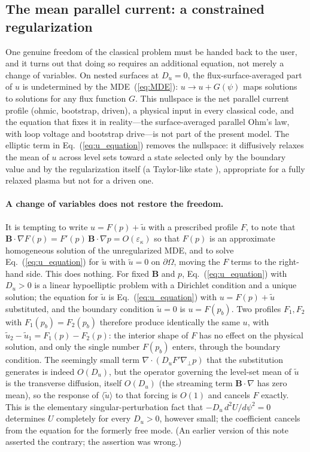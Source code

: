 \documentclass[english]{article}
\newcommand{\bB}{\mathbf{B}}
\newcommand{\gradperp}{\nabla_{\!\perp}}
\begin{document}
\subsection{The mean parallel current: a constrained regularization}
\label{sec:net_current}

One genuine freedom of the classical problem must be handed back to the user, and it turns out
that doing so requires an additional equation, not merely a change of variables. On nested
surfaces at $D_u=0$, the flux-surface-averaged part of $u$ is undetermined by the
MDE~(\ref{eq:MDE}): $u\rightarrow u+G(\psi)$ maps solutions to solutions for any flux function
$G$. This nullspace is the net parallel current profile (ohmic, bootstrap, driven), a physical
input in every classical code, and the equation that fixes it in reality---the surface-averaged
parallel Ohm's law, with loop voltage and bootstrap drive---is not part of the present model.
The elliptic term in Eq.~(\ref{eq:u_equation}) removes the nullspace: it diffusively relaxes the
mean of $u$ across level sets toward a state selected only by the boundary value and by the
regularization itself (a Taylor-like state \cite{boozer1986}), appropriate for a fully relaxed
plasma but not for a driven one.

\paragraph{A change of variables does not restore the freedom.}
It is tempting to write $u=F(p)+\tilde u$ with a prescribed profile $F$, to note that
$\bB\cdot\nabla F(p)=F'(p)\,\bB\cdot\nabla p=O(\varepsilon_\kappa)$ so that $F(p)$ is an
approximate homogeneous solution of the unregularized MDE, and to solve
Eq.~(\ref{eq:u_equation}) for $\tilde u$ with $\tilde u=0$ on $\partial\Omega$, moving the $F$
terms to the right-hand side. This does nothing. For fixed $\bB$ and $p$,
Eq.~(\ref{eq:u_equation}) with $D_u>0$ is a linear hypoelliptic problem with a Dirichlet
condition and a unique solution; the equation for $\tilde u$ is Eq.~(\ref{eq:u_equation}) with
$u=F(p)+\tilde u$ substituted, and the boundary condition $\tilde u=0$ is $u=F(p_b)$. Two
profiles $F_1,F_2$ with $F_1(p_b)=F_2(p_b)$ therefore produce identically the same $u$, with
$\tilde u_2-\tilde u_1=F_1(p)-F_2(p)$: the interior shape of $F$ has no effect on the physical
solution, and only the single number $F(p_b)$ enters, through the boundary condition. The
seemingly small term $\nabla\cdot(D_uF'\gradperp p)$ that the substitution generates is indeed
$O(D_u)$, but the operator governing the level-set mean of $\tilde u$ is the transverse
diffusion, itself $O(D_u)$ (the streaming term $\bB\cdot\nabla$ has zero mean), so the response
of $\langle\tilde u\rangle$ to that forcing is $O(1)$ and cancels $F$ exactly. This is the
elementary singular-perturbation fact that $-D_u\,d^2U/d\psi^2=0$ determines $U$ completely for
every $D_u>0$, however small; the coefficient cancels from the equation for the formerly free
mode. (An earlier version of this note asserted the contrary; the assertion was wrong.)
\end{document}

